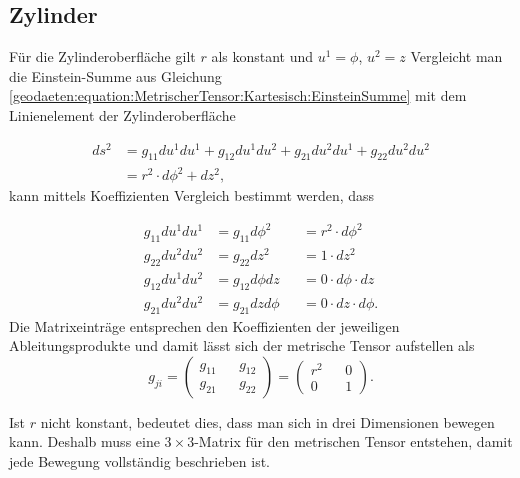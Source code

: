 %
%
%
%
\subsection{Zylinder\label{geodaeten:section:MetrischerTensor:Zylinder}}

Für die Zylinderoberfläche gilt $r$ als konstant und $u^1 = \phi$, $u^2 =z$ 
Vergleicht man die Einstein-Summe aus Gleichung \eqref{geodaeten:equation:MetrischerTensor:Kartesisch:EinsteinSumme} mit dem Linienelement der Zylinderoberfläche

\begin{equation}
	\begin{aligned}
	ds^2 &= g_{11}  du^1  du^1 + g_{12}  du^1  du^2 + g_{21}  du^2  du^1 + g_{22}  du^2  du^2 \\
	&= r^2 \cdot d \phi^2 +dz^2 ,
	\end{aligned}
\end{equation}
kann mittels Koeffizienten Vergleich bestimmt werden, dass 

\begin{equation}
	\begin{alignedat}{3}
		g_{11}  du^1 du^1 &= g_{11}  d \phi^2 & &= r^2 \cdot d \phi^2 \\
		g_{22}  du^2 du^2 &= g_{22}  dz^2    & &= 1 \cdot dz^2 \\
		g_{12}  du^1 du^2 &= g_{12}  d \phi  dz & &= 0 \cdot d \phi \cdot dz \\
		g_{21}  du^2 du^2 &= g_{21}  dz  d \phi & &= 0 \cdot dz \cdot d \phi .
	\end{alignedat}
\end{equation}
Die Matrixeinträge entsprechen den Koeffizienten der jeweiligen Ableitungsprodukte und damit lässt sich der metrische Tensor aufstellen als
\begin{equation}
	g_{ji} =\begin{pmatrix} g_{11} && g_{12} \\ g_{21} && g_{22} \end{pmatrix}= \begin{pmatrix} r^2 && 0 \\ 0 && 1 \end{pmatrix} .
\end{equation}

Ist $r$ nicht konstant, bedeutet dies, dass man sich in drei Dimensionen bewegen kann.
Deshalb muss eine $3 \times 3$-Matrix für den metrischen Tensor entstehen, damit jede Bewegung vollständig beschrieben ist. 

